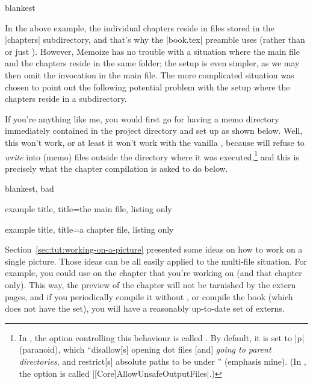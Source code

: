 \documentclass[a4paper,11pt]{article}
\begin{document}
\begin{tcboxedraster}[raster columns=2, raster valign=top]{blankest}
\end{tcboxedraster}

In the above example, the individual chapters reside in files stored in the
|chapters| subdirectory, and that's why the |book.tex| preamble uses
 (rather than  or just ).  However, Memoize has no trouble
with a situation where the main file and the chapters reside in the same
folder; the setup is even simpler, as we may then omit the 
invocation in the main file.  The more complicated situation was chosen to
point out the following potential problem with the setup where the chapters
reside in a subdirectory.

If you're anything like me, you would first go for having a memo directory
immediately contained in the project directory and set up  as
shown below.  Well, this won't work, or at least it won't work with the vanilla
\TeXLive, because  will refuse to \emph{write} into (memo)
files outside the directory where it was
executed,\cprotect\footnote{\label{fn:openout_any}In \TeXLive, the
   option controlling this behaviour is called
  .  By default, it is set to |p| (paranoid), which
  ``disallow[s] opening dot files [and] \emph{going to parent directories}, and
  restrict[s] absolute paths to be under '' (emphasis
  mine).  (In \MiKTeX, the option is called
  |[Core]AllowUnsafeOutputFiles|.)}  and this is precisely what the chapter
compilation is asked to do below.

\begin{tcboxedraster}[raster columns=2, raster valign=top]{blankest, bad}
  \begin{tcblisting}{example title, title=the main file, listing only}

  \end{tcblisting}
  \begin{tcblisting}{example title, title=a chapter file, listing only}
  \end{tcblisting}
\end{tcboxedraster}

\pagebreak %

Section~\ref{sec:tut:working-on-a-picture} presented some ideas on how to work
on a single picture.  Those ideas can be all easily applied to the multi-file
situation.  For example, you could use  on the chapter that you're
working on (and that chapter only).  This way, the preview of the chapter will
not be tarnished by the extern pages, and if you periodically compile it
without , or compile the book (which does not have the 
set), you will have a reasonably up-to-date set of externs.
\end{document}
